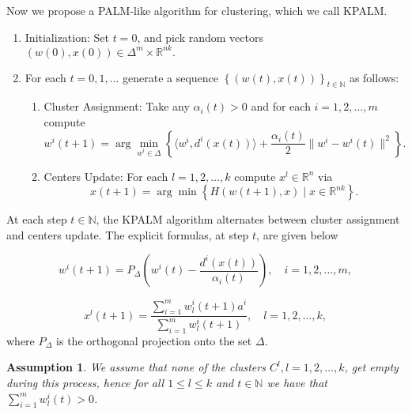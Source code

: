 \documentclass[11pt]{article}
\numberwithin{equation}{section}
\newtheorem{assumption}{Assumption}
\begin{document}
Now we propose a PALM-like algorithm for clustering, which we call KPALM.
\begin{enumerate}[(1)]
	\item Initialization: Set $t=0$, and pick random vectors $(w(0),x(0)) \in \Delta^m \times \mathbb{R}^{nk} .$

	\item For each $t=0,1, \ldots$ generate a sequence $\left\lbrace(w(t),x(t))\right\rbrace_{t \in \mathbb{N}}$ as follows:
	\begin{enumerate}[(2.1)]
		\item Cluster Assignment: Take any $\alpha_i(t) > 0$ and for each $i=1, 2, \ldots ,m$ compute
		\begin{equation}
			w^i(t+1) = \arg\min\limits_{w^i \in \Delta} \left\lbrace \langle w^i , d^i(x(t)) \rangle + \frac{\alpha_i(t)}{2} \|w^i - w^i(t)\|^2 \right\rbrace . \label{StateEq5}
		\end{equation}
		
		\item Centers Update: For each $l=1, 2, \ldots ,k$ compute $x^l \in \mathbb{R}^n$ via
		\begin{equation}
			x(t+1) = \arg\min \left\lbrace H(w(t+1), x) \mid x \in \mathbb{R}^{nk} \right\rbrace . \label{StateEq6}
		\end{equation}
	\end{enumerate}
\end{enumerate}

\newpage

At each step $t \in \mathbb{N}$, the KPALM algorithm alternates between cluster assignment and centers update. The explicit formulas, at step $t$, are given below

\begin{equation}
w^i(t+1) = P_{\Delta} \left(w^i(t) - \frac{d^i(x(t))}{\alpha_i(t)}\right) , \quad i=1, 2, \ldots ,m , \label{StateEq7}
\end{equation}

\begin{equation}
x^l(t+1) = \frac{\sum_{i=1}^{m} w^i_l(t+1) a^i}{\sum_{i=1}^{m} w^i_l(t+1)} , \quad l=1, 2, \ldots ,k , \label{StateEq8}
\end{equation}
where $P_{\Delta}$ is the orthogonal projection onto the set $\Delta$.

\begin{assumption} \label{StateEq17}
We assume that none of the clusters $C^l, l = 1,2, \ldots ,k$, get empty during this process, hence for all $1 \leq l \leq k$ and $t \in \mathbb{N}$ we have that $\sum\limits_{i=1}^{m} w^i_l(t) > 0$.
\end{assumption}
	
\end{document}
